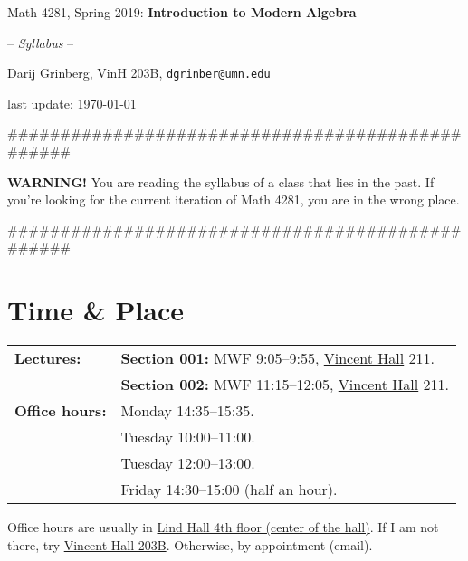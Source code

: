 \documentclass[numbers=enddot,12pt,final,onecolumn,notitlepage]{scrartcl}%
\theoremstyle{definition}
\newenvironment{noncompile}{}{}
\begin{document}
\begin{center}
Math 4281, Spring 2019: \textbf{Introduction to Modern Algebra}

-- \textit{Syllabus} --

Darij Grinberg, VinH 203B, \texttt{dgrinber@umn.edu}

last update: \today



\end{center}

\bigskip

\#\#\#\#\#\#\#\#\#\#\#\#\#\#\#\#\#\#\#\#\#\#\#\#\#\#\#\#\#\#\#\#\#\#\#\#\#\#\#\#\#\#\#\#\#\#\#\#\#

\textbf{WARNING!} You are reading the syllabus of a class that lies in the
past. If you're looking for the current iteration of Math 4281, you are in the
wrong place.

\#\#\#\#\#\#\#\#\#\#\#\#\#\#\#\#\#\#\#\#\#\#\#\#\#\#\#\#\#\#\#\#\#\#\#\#\#\#\#\#\#\#\#\#\#\#\#\#\#

\bigskip

\section{Time \& Place}%

\begin{tabular}
[c]{|ll|}\hline
\textbf{Lectures:} & \textbf{Section 001:} MWF 9:05--9:55,
\href{http://campusmaps.umn.edu/vincent-hall}{Vincent Hall} 211.\\
& \textbf{Section 002:} MWF 11:15--12:05,
\href{http://campusmaps.umn.edu/vincent-hall}{Vincent Hall} 211.\\\hline
\textbf{Office hours:} & Monday 14:35--15:35.\\
& Tuesday 10:00--11:00.\\
& Tuesday 12:00--13:00.\\
& Friday 14:30--15:00 (half an hour).\\\hline
\end{tabular}


\begin{noncompile}
\vspace{0.1cm}Office hours are usually in
\href{http://campusmaps.umn.edu/lind-hall}{Lind Hall 4th floor (center of the
hall)}. If I am not there, try
\href{http://campusmaps.umn.edu/vincent-hall}{Vincent Hall 203B}. Otherwise,
by appointment (email).
\end{noncompile}

\bigskip
\end{document}
